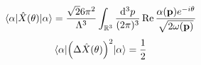 \begin{equation}
	\expval{\hat{X}(\theta)}{\alpha}
	=
	\frac{\sqrt{2}6\pi^2}{\Lambda^3}
	\int_{\mathbb{R}^3}
	\frac{\dd[3]{p}}{(2\pi)^3}
	\operatorname{\operatorname{Re}}{\frac{\alpha(\vb{p})e^{-i\theta}}{\sqrt{2\omega(\vb{p})}}}
\end{equation}
\begin{equation}
	\expval{\left(\Delta\hat{X}(\theta)\right)^2}{\alpha}
	=
	\frac{1}{2}
\end{equation}